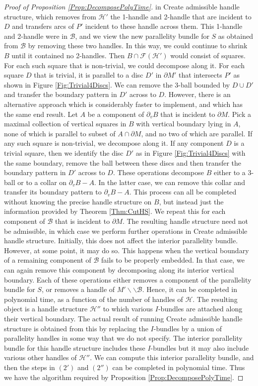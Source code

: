 \documentclass[oneside]{amsart}
\numberwithin{equation}{section}
\theoremstyle{plain}
\theoremstyle{definition}
\newcommand{\cut}{\backslash\backslash}
\newcommand{\calH}{\mathcal{H}}
\newcommand{\calB}{\mathcal{B}}
\newcommand{\calF}{\mathcal{F}}
\begin{document}
\begin{proof}[Proof of Proposition \ref{Prop:DecomposePolyTime}]
in {\sc Create admissible handle structure}, which removes from $\calH'$ the 1-handle and 2-handle that are incident to $D$ and transfers arcs of $P'$ incident to these handle across them. This 1-handle and 2-handle were in $\calB$, and we view the new parallelity bundle for $S$ as obtained from $\calB$ by removing these two handles. In this way, we could continue to shrink $B$ until it contained no 2-handles. Then $B \cap \calF(\calH')$ would consist of squares. For each such square that is non-trivial, we could decompose along it. For each square $D$ that is trivial, it is parallel to a disc $D'$ in $\partial M'$ that intersects $P'$ as shown in Figure \ref{Fig:Trivial4Discs}. We can remove the 3-ball bounded by $D \cup D'$ and transfer the boundary pattern in $D'$ across to $D$. However, there is an alternative approach which is considerably faster to implement, and which has the same end result. Let $A$ be a component of $\partial_v B$ that is incident to $\partial M$. Pick a maximal collection of vertical squares in $B$ with vertical boundary lying in $A$, none of which is parallel to subset of $A \cap \partial M$, and no two of which are parallel. If any such square is non-trivial, we decompose along it. If any component $D$ is a trivial square, then we identify the disc $D'$ as in Figure \ref{Fig:Trivial4Discs} with the same boundary, remove the ball between these discs and then transfer the boundary pattern in $D'$ across to $D$. These operations decompose $B$ either to a 3-ball or to a collar on $\partial_v B - A$. In the latter case, we can remove this collar and transfer its boundary pattern to $\partial_v B - A$. This process can all be completed without knowing the precise handle structure on $B$, but instead just the information provided by Theorem \ref{Thm:CutHS}. We repeat this for each component of $\calB$ that is incident to $\partial M$. The resulting handle structure need not be admissible, in which case we perform further operations in {\sc Create admissible handle structure}. Initially, this does not affect the interior parallelity bundle. However, at some point, it may do so. This happens when the vertical boundary of a remaining component of $\calB$ fails to be properly embedded. In that case, we can again remove this component by decomposing along its interior vertical boundary. Each of these operations either removes a component of the parallelity bundle for $S$, or removes a handle of $M' \cut \calB$. Hence, it can be completed in polynomial time, as a function of the number of handles of $\calH$. The resulting object is a handle structure $\calH''$ to which various $I$-bundles are attached along their vertical boundary. The actual result of running {\sc Create admissible handle structure} is obtained from this by replacing the $I$-bundles by a union of parallelity handles in some way that we do not specify. The interior parallelity bundle for this handle structure includes these $I$-bundles but it may also include various other handles of $\calH''$. We can compute this interior parallelity bundle, and then the steps in $(2')$ and $(2'')$ can be completed in polynomial time. Thus we have the algorithm required by Proposition \ref{Prop:DecomposePolyTime}. \end{proof}
\end{document}
